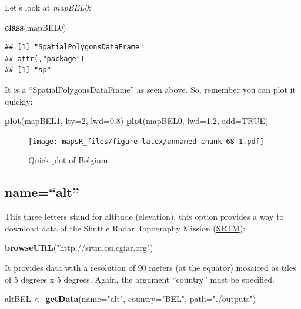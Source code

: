 \documentclass[]{report}
\newenvironment{Shaded}{\begin{snugshade}}{\end{snugshade}}
\newcommand{\DataTypeTok}[1]{\textcolor[rgb]{0.13,0.29,0.53}{#1}}
\newcommand{\DecValTok}[1]{\textcolor[rgb]{0.00,0.00,0.81}{#1}}
\newcommand{\FloatTok}[1]{\textcolor[rgb]{0.00,0.00,0.81}{#1}}
\newcommand{\KeywordTok}[1]{\textcolor[rgb]{0.13,0.29,0.53}{\textbf{#1}}}
\newcommand{\NormalTok}[1]{#1}
\newcommand{\OtherTok}[1]{\textcolor[rgb]{0.56,0.35,0.01}{#1}}
\newcommand{\StringTok}[1]{\textcolor[rgb]{0.31,0.60,0.02}{#1}}
\begin{document}
Let's look at \emph{mapBEL0}:

\begin{Shaded}
\begin{Highlighting}[]
\KeywordTok{class}\NormalTok{(mapBEL0)}
\end{Highlighting}
\end{Shaded}

\begin{verbatim}
## [1] "SpatialPolygonsDataFrame"
## attr(,"package")
## [1] "sp"
\end{verbatim}

It is a ``SpatialPolygonsDataFrame'' as seen above. So, remember you can
plot it quickly:

\begin{Shaded}
\begin{Highlighting}[]
\KeywordTok{plot}\NormalTok{(mapBEL1, }\DataTypeTok{lty=}\DecValTok{2}\NormalTok{, }\DataTypeTok{lwd=}\FloatTok{0.8}\NormalTok{)}
\KeywordTok{plot}\NormalTok{(mapBEL0, }\DataTypeTok{lwd=}\FloatTok{1.2}\NormalTok{, }\DataTypeTok{add=}\OtherTok{TRUE}\NormalTok{)}
\end{Highlighting}
\end{Shaded}

\begin{figure}
\centering
\texttt{[image: mapsR\_files/figure-latex/unnamed-chunk-68-1.pdf]}
\caption{Quick plot of Belgium}
\end{figure}

\hypertarget{namealt}{%
\subsection{name=``alt''}\label{namealt}}

This three letters stand for altitude (elevation), this option provides
a way to download data of the Shuttle Radar Topography Mission
(\href{http://srtm.csi.cgiar.org/}{SRTM}):

\begin{Shaded}
\begin{Highlighting}[]
\KeywordTok{browseURL}\NormalTok{(}\StringTok{"http://srtm.csi.cgiar.org"}\NormalTok{)}
\end{Highlighting}
\end{Shaded}

It provides data with a resolution of 90 meters (at the equator)
mosaiced as tiles of 5 degrees x 5 degrees. Again, the argument
``country'' must be specified.

\begin{Shaded}
\begin{Highlighting}[]
\NormalTok{altBEL <-}\StringTok{ }\KeywordTok{getData}\NormalTok{(}\DataTypeTok{name=}\StringTok{"alt"}\NormalTok{, }\DataTypeTok{country=}\StringTok{"BEL"}\NormalTok{, }\DataTypeTok{path=}\StringTok{"./outputs"}\NormalTok{)}
\end{Highlighting}
\end{Shaded}
\end{document}
